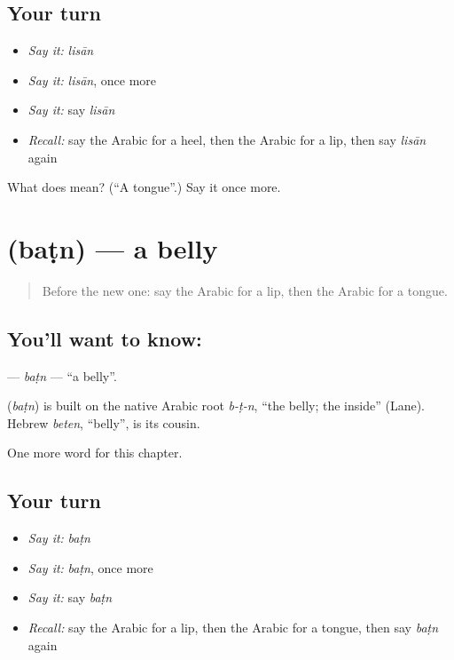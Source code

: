 \subsection*{Your turn}
\begin{itemize}
\raggedright
  \item \emph{Say it:} \emph{lisān}
  \item \emph{Say it:} \emph{lisān}, once more
  \item \emph{Say it:} say \emph{lisān}
  \item \emph{Recall:} say the Arabic for a heel, then the Arabic for a lip, then say \emph{lisān} again
\end{itemize}

\begin{tcolorbox}[breakable,colback=teal!4,colframe=teal!35!black,title={Before you move on}]
What does  mean? (\textquotedblleft{}A tongue\textquotedblright{}.) Say it once more.
\end{tcolorbox}
\section[\texorpdfstring{\ar{بطن} (baṭn)}{بطن (baṭn)}]{ (baṭn) — a belly}

\label{lesson:AR-C141-batn}



\begin{quote}
Before the new one: say the Arabic for a lip, then the Arabic for a tongue.
\end{quote}

\subsection*{You'll want to know: }
\textbf{} — \emph{baṭn} — \textquotedblleft{}a belly\textquotedblright{}.

\begin{cousinweb}
\textbf{} (\emph{baṭn}) is built on the native Arabic root \emph{b-ṭ-n}, \textquotedblleft{}the belly; the inside\textquotedblright{} (Lane). Hebrew \emph{beten}, \textquotedblleft{}belly\textquotedblright{}, is its cousin.
\end{cousinweb}

\begin{grammarlens}[title={What you've built}]
One more word for this chapter.
\end{grammarlens}

\subsection*{Your turn}
\begin{itemize}
\raggedright
  \item \emph{Say it:} \emph{baṭn}
  \item \emph{Say it:} \emph{baṭn}, once more
  \item \emph{Say it:} say \emph{baṭn}
  \item \emph{Recall:} say the Arabic for a lip, then the Arabic for a tongue, then say \emph{baṭn} again
\end{itemize}

